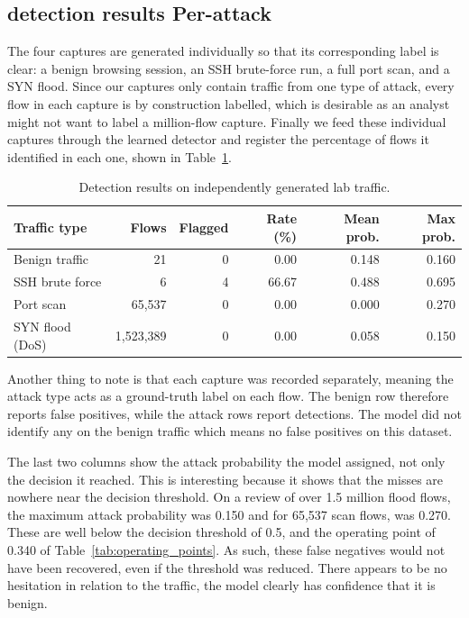 \subsection{detection results Per-attack}
\label{sec:results_perattack}

The four captures are generated individually so that its corresponding label is clear: a benign browsing session, an SSH brute-force run, a full port scan, and a SYN flood. Since our captures only contain traffic from one type of attack, every flow in each capture is by construction labelled, which is desirable as an analyst might not want to label a million-flow capture. Finally we feed these individual captures through the learned detector and register the percentage of flows it identified in each one, shown in Table~\ref{tab:per-attack-results}.

\begin{table}[H]
  \centering
  \caption{Detection results on independently generated lab traffic.}
  \label{tab:per-attack-results}
  \renewcommand{\arraystretch}{1.3}
  \begin{tabularx}{\textwidth}{Xrrrrr}
    \toprule
    \textbf{Traffic type} & \textbf{Flows} & \textbf{Flagged} & \textbf{Rate (\%)} & \textbf{Mean prob.} & \textbf{Max prob.} \\
    \midrule
    Benign traffic     & 21            & 0 & 0.00  & 0.148 & 0.160 \\
    SSH brute force    & 6             & 4 & 66.67 & 0.488 & 0.695 \\
    Port scan          & 65,537        & 0 & 0.00  & 0.000 & 0.270 \\
    SYN flood (DoS)    & 1,523,389     & 0 & 0.00  & 0.058 & 0.150 \\
    \bottomrule
  \end{tabularx}
\end{table}

Another thing to note is that each capture was recorded separately, meaning the attack type acts as a ground-truth label on each flow. The benign row therefore reports false positives, while the attack rows report detections. The model did not identify any on the benign traffic which means no false positives on this dataset.

The last two columns show the attack probability the model assigned, not only the decision it reached. This is interesting because it shows that the misses are nowhere near the decision threshold. On a review of over 1.5 million flood flows, the maximum attack probability was 0.150 and for 65,537 scan flows, was 0.270.
These are well below the decision threshold of 0.5, and the operating point of 0.340 of Table~\ref{tab:operating_points}.
As such, these false negatives would not have been recovered, even if the threshold was reduced. There appears to be no hesitation in relation to the traffic, the model clearly has confidence that it is benign.

